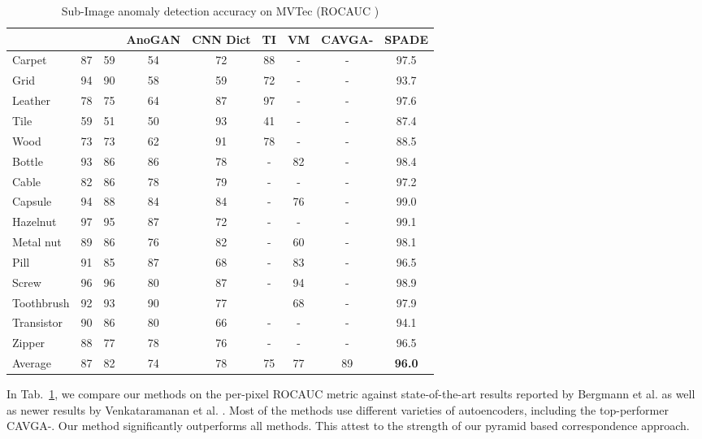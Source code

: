 \documentclass[runningheads]{llncs}
\begin{document}
\begin{table}[t]
  \centering
  \caption{Sub-Image anomaly detection accuracy on MVTec (ROCAUC )}
  \label{tab:mvtec_pixel_roc}

    \begin{tabular}{lcccccccc}
    \toprule      

   &   &    & AnoGAN  & CNN Dict & TI & VM & CAVGA-  & SPADE\\
    \midrule
Carpet &	87	&	59	&	54	&	72	&	88	&	-	& -	& 97.5	\\
Grid &	94	&	90	&	58	&	59	&	72	&	-	&-	& 93.7	\\
Leather &	78	&	75	&	64	&	87	&	97	&	-	&-	& 97.6	\\
Tile &	59	&	51	&	50	&	93	&	41	&	-	&	-& 87.4	\\
Wood &	73	&	73	&	62	&	91	&	78	&	-	&-	& 88.5	\\
Bottle &	93	&	86	&	86	&	78	&	-	&	82	& -	& 98.4	\\
Cable &	82	&	86	&	78	&	79	&	-	&	-	& -	& 97.2	\\
Capsule &	94	&	88	&	84	&	84	&	-	&	76	& -	& 99.0	\\
Hazelnut &	97	&	95	&	87	&	72	&	-	&	-	& -	& 99.1	\\
Metal nut &	89	&	86	&	76	&	82	&	-	&	60	&	-& 98.1	\\
Pill &	91	&	85	&	87	&	68	&	-	&	83	&-	& 96.5	\\
Screw &	96	&	96	&	80	&	87	&	-	&	94	&	-& 98.9	\\
Toothbrush &	92	&	93	&	90	&	77	&		&	68	&-	& 97.9	\\
Transistor &	90	&	86	&	80	&	66	&	-	&	-	&-	& 94.1	\\
Zipper &	88	&	77	&	78	&	76	&	-	&	-	&-	& 96.5	\\
\midrule														
Average & 87	&	82	&	74	&	78	&	75	&	77	& 89	& \textbf{96.0}	\\
	 \bottomrule
    \end{tabular}
\end{table}

In Tab.~\ref{tab:mvtec_pixel_roc}, we compare our methods on the per-pixel ROCAUC metric against state-of-the-art results reported by Bergmann et al. \cite{bergmann2019mvtec} as well as newer results by Venkataramanan et al. \cite{venkataramanan2019attention}. Most of the methods use different varieties of autoencoders, including the top-performer CAVGA-. Our method significantly outperforms all methods. This attest to the strength of our pyramid based correspondence approach. 
\end{document}

